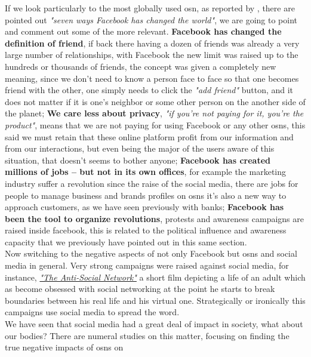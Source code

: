 \indent If we look particularly to the most globally used \gls{osn}, as reported by \cite{relrevfacebook}, there are pointed out \textit{"seven ways Facebook has changed the world"}, we are going to point and comment out some of the more relevant. \textbf{Facebook has changed the definition of friend}, if back there having a dozen of friends was already a very large number of relationships, with Facebook the new limit was raised up to the hundreds or thousands of friends, the concept was given a completely new meaning, since we don't need to know a person face to face so that one becomes friend with the other, one simply needs to click the \textit{"add friend"} button, and it does not matter if it is one's neighbor or some other person on the another side of the planet; \textbf{We care less about privacy}, \textit{"if you’re not paying for it, you’re the product"}, means that we are not paying for using Facebook or any other \glspl{osn}, this said we must retain that these online platform profit from our information and from our interactions, but even being the major of the users aware of this situation, that doesn't seems to bother anyone; \textbf{Facebook has created millions of jobs – but not in its own offices}, for example the marketing industry suffer a revolution since the raise of the social media, there are jobs for people to manage business and brands profiles on \glspl{osn} it's also a new way to approach customers, as we have seen previously with banks; \textbf{Facebook has been the tool to organize revolutions}, protests and awareness campaigns are raised inside facebook, this is related to the political influence and awareness capacity that we previously have pointed out in this same section.\\
\indent Now switching to the negative aspects of not only Facebook but \glspl{osn} and social media in general. Very strong campaigns were raised against social media, for instance, \href{http://www.imdb.com/title/tt3333168/}{\textit{"The Anti-Social Network"}} a short film depicting a life of an adult which as become obsessed with social networking at the point he starts to break boundaries between his real life and his virtual one. Strategically or ironically this campaigns use social media to spread the word.\\
\indent We have seen that social media had a great deal of impact in society, what about our bodies?  There are numeral studies on this matter, focusing on finding the true negative impacts of \glspl{osn} on
